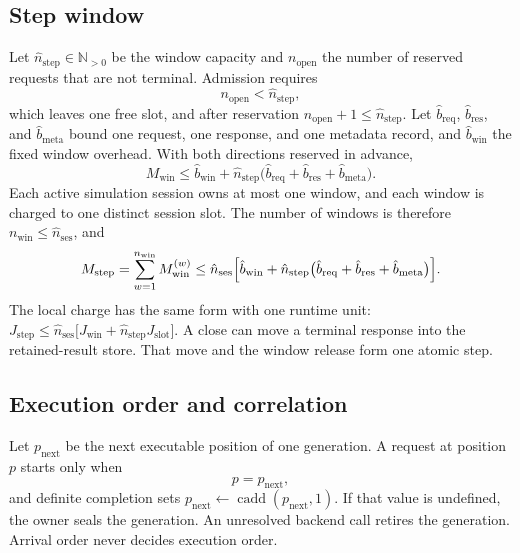 \documentclass[11pt,a4paper]{article}
\theoremstyle{definition}
\newcommand{\cadd}{\operatorname{cadd}}
\begin{document}

\subsection{Step window}

Let $\hat n_{\mathrm{step}}\in\mathbb{N}_{>0}$ be the window capacity and
$n_{\mathrm{open}}$ the number of reserved requests that are not terminal. Admission
requires
\begin{equation}\label{eq:window-admit}
n_{\mathrm{open}}<\hat n_{\mathrm{step}},
\end{equation}
which leaves one free slot, and after reservation
$n_{\mathrm{open}}+1\leq\hat n_{\mathrm{step}}$. Let $\hat b_{\mathrm{req}}$,
$\hat b_{\mathrm{res}}$, and $\hat b_{\mathrm{meta}}$ bound one request, one response,
and one metadata record, and $\hat b_{\mathrm{win}}$ the fixed window overhead. With
both directions reserved in advance,
\begin{equation}\label{eq:window-memory}
M_{\mathrm{win}}\leq\hat b_{\mathrm{win}}+\hat n_{\mathrm{step}}
\bigl(\hat b_{\mathrm{req}}+\hat b_{\mathrm{res}}+\hat b_{\mathrm{meta}}\bigr).
\end{equation}
Each active simulation session owns at most one window, and each window is charged to
one distinct session slot. The number of windows is therefore
$n_{\mathrm{win}}\leq\hat n_{\mathrm{ses}}$, and
\begin{equation}\label{eq:window-total}
M_{\mathrm{step}}=\sum_{w=1}^{n_{\mathrm{win}}}M_{\mathrm{win}}^{(w)}
\leq\hat n_{\mathrm{ses}}\Bigl[\hat b_{\mathrm{win}}+\hat n_{\mathrm{step}}
\bigl(\hat b_{\mathrm{req}}+\hat b_{\mathrm{res}}+\hat b_{\mathrm{meta}}\bigr)\Bigr].
\end{equation}
The local charge has the same form with one runtime unit:
$J_{\mathrm{step}}\leq\hat n_{\mathrm{ses}}\bigl[J_{\mathrm{win}}+\hat
n_{\mathrm{step}}J_{\mathrm{slot}}\bigr]$. A close can move a terminal response into the
retained-result store. That move and the window release form one atomic step.

\subsection{Execution order and correlation}

Let $p_{\mathrm{next}}$ be the next executable position of one generation. A request
at position $p$ starts only when
\begin{equation}\label{eq:step-order}
p=p_{\mathrm{next}},
\end{equation}
and definite completion sets $p_{\mathrm{next}}\leftarrow\cadd(p_{\mathrm{next}},1)$.
If that value is undefined, the owner seals the generation. An unresolved backend call
retires the generation. Arrival order never decides execution order.
\end{document}
